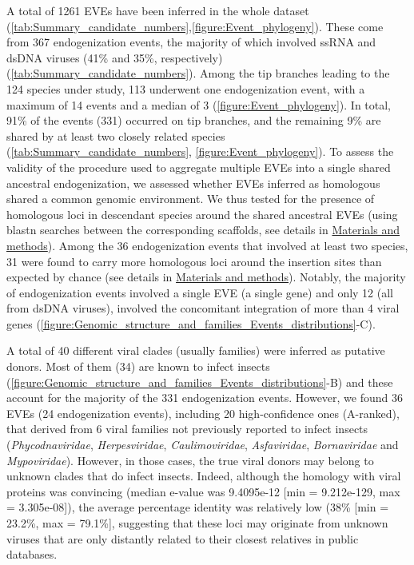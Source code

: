 A total of 1261 EVEs have been inferred in the whole dataset (\tablename{\ref{tab:Summary_candidate_numbers}},\figurename{\ref{figure:Event_phylogeny}}). These come from 367 endogenization events, the majority of which involved ssRNA and dsDNA viruses (41\% and 35\%, respectively) (\tablename{\ref{tab:Summary_candidate_numbers}}). Among the tip branches leading to the 124 species under study, 113 underwent one endogenization event, with a maximum of 14 events and a median of 3 (\figurename{\ref{figure:Event_phylogeny}}). In total, 91\% of the events (331) occurred on tip branches, and the remaining 9\% are shared by at least two closely related species (\tablename{\ref{tab:Summary_candidate_numbers}}, \figurename{\ref{figure:Event_phylogeny}}). To assess the validity of the procedure used to aggregate multiple EVEs into a single shared ancestral endogenization, we assessed whether EVEs inferred as homologous shared a common genomic environment. We thus tested for the presence of homologous loci in descendant species around the shared ancestral EVEs (using blastn searches between the corresponding scaffolds, see details in \hyperref[sec:MM-6]{Materials and methods}). Among the 36 endogenization events that involved at least two species, 31 were found to carry more homologous loci around the insertion sites than expected by chance (see details in \hyperref[sec:MM-6]{Materials and methods}). Notably, the majority of endogenization events involved a single EVE (a single gene) and only 12 (all from dsDNA viruses), involved the concomitant integration of more than 4 viral genes (\figurename{\ref{figure:Genomic_structure_and_families_Events_distributions}}-C).  

A total of 40 different viral clades (usually families) were inferred as putative donors. Most of them (34) are known to infect insects (\figurename{\ref{figure:Genomic_structure_and_families_Events_distributions}}-B) and these account for the majority of the 331 endogenization events.  However, we found 36 EVEs (24 endogenization events), including 20 high-confidence ones (A-ranked), that derived from 6 viral families not previously reported to infect insects (\textit{Phycodnaviridae}, \textit{Herpesviridae}, \textit{Caulimoviridae}, \textit{Asfaviridae}, \textit{Bornaviridae} and \textit{Mypoviridae}). However, in those cases, the true viral donors may belong to unknown clades that do infect insects. Indeed, although the homology with viral proteins was convincing (median e-value was 9.4095e-12 [min = 9.212e-129, max = 3.305e-08]), the average percentage identity was relatively low (38\% [min = 23.2\%, max = 79.1\%], suggesting that these loci may originate from unknown viruses that are only distantly related to their closest relatives in public databases.


